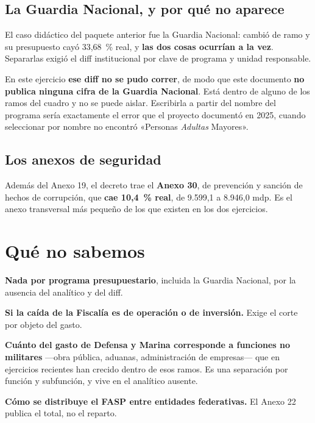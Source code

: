 \subsection*{La Guardia Nacional, y por qué no aparece}

El caso didáctico del paquete anterior fue la Guardia Nacional: cambió de ramo y su
presupuesto cayó 33,68~\% real, y \textbf{las dos cosas ocurrían a la vez}. Separarlas exigió
el diff institucional por clave de programa y unidad responsable.

En este ejercicio \textbf{ese diff no se pudo correr}, de modo que este documento
\textbf{no publica ninguna cifra de la Guardia Nacional}. Está dentro de alguno de los ramos
del cuadro y no se puede aislar. Escribirla a partir del nombre del programa sería
exactamente el error que el proyecto documentó en 2025, cuando seleccionar por nombre no
encontró «Personas \emph{Adultas} Mayores».

\subsection*{Los anexos de seguridad}

Además del Anexo 19, el decreto trae el \textbf{Anexo 30}, de prevención y sanción de hechos
de corrupción, que \textbf{cae 10,4~\% real}, de 9.599,1 a 8.946,0 mdp. Es el anexo
transversal más pequeño de los que existen en los dos ejercicios.

\section{Qué no sabemos}

\begin{list}{}{\setlength{\leftmargin}{1.4em}\setlength{\itemsep}{2pt}}
\item[$\bullet$] \textbf{Nada por programa presupuestario}, incluida la Guardia Nacional,
por la ausencia del analítico y del diff.
\item[$\bullet$] \textbf{Si la caída de la Fiscalía es de operación o de inversión.} Exige
el corte por objeto del gasto.
\item[$\bullet$] \textbf{Cuánto del gasto de Defensa y Marina corresponde a funciones no
militares} ---obra pública, aduanas, administración de empresas--- que en ejercicios
recientes han crecido dentro de esos ramos. Es una separación por función y subfunción, y
vive en el analítico ausente.
\item[$\bullet$] \textbf{Cómo se distribuye el FASP entre entidades federativas.} El Anexo
22 publica el total, no el reparto.
\end{list}

